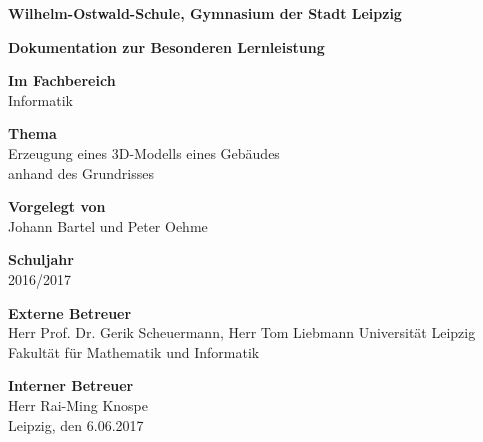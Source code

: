 \begin{center}
	\thispagestyle{empty}
			\textbf{Wilhelm-Ostwald-Schule, Gymnasium der Stadt Leipzig}
			
			\Large
			\textbf{Dokumentation zur Besonderen Lernleistung} \break
			
			\large
			\textbf{Im Fachbereich}\\
			Informatik \break
			
			
			\textbf{Thema}\\
			Erzeugung eines 3D-Modells eines Gebäudes\\ anhand des Grundrisses \break
			
			\textbf{Vorgelegt von}\\
			Johann Bartel und Peter Oehme \break
			
			\textbf{Schuljahr}\\
			2016/2017 \break
			
			\textbf{Externe Betreuer}\\
			Herr Prof. Dr. Gerik Scheuermann, Herr Tom Liebmann \break
			Universität Leipzig
			Fakultät für Mathematik und Informatik \break
			
			\textbf{Interner Betreuer}\\
			Herr Rai-Ming Knospe\\
			Leipzig, den 6.06.2017
			
	 
			
\end{center}